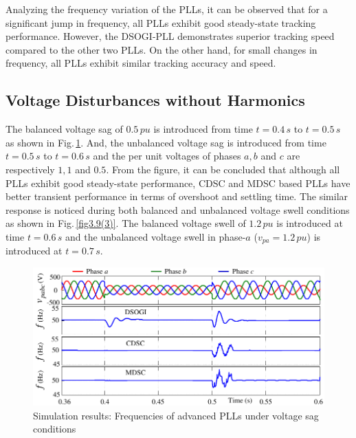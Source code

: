 Analyzing the frequency variation of the PLLs, it can be observed that for a significant jump in frequency, all PLLs exhibit good steady-state tracking performance. However, the DSOGI-PLL demonstrates superior tracking speed compared to the other two PLLs. On the other hand, for small changes in frequency, all PLLs exhibit similar tracking accuracy and speed. 
\subsection{Voltage Disturbances without Harmonics}
The balanced voltage sag of $0.5\,\si{pu}$ is introduced from time $t=0.4\,\si{s}$ to $t=0.5\,\si{s}$ as shown in Fig.\,\ref{fig3.9(2)}. And, the unbalanced voltage sag is introduced from time $t=0.5\,\si{s}$ to $t=0.6\,\si{s}$ and the per unit voltages of phases $a,b$ and $c$ are respectively $1, 1$ and $0.5$. From the figure, it can be concluded that although all PLLs exhibit good steady-state performance, CDSC and MDSC based PLLs have better transient performance in terms of overshoot and settling time. The similar response is noticed during both balanced and unbalanced voltage swell conditions as shown in Fig.\,\ref{fig3.9(3)}. The balanced voltage swell of $1.2\,\si{pu}$ is introduced at time $t=0.6\,\si{s}$ and the unbalanced voltage swell in phase-$a$ ($v_{pa}=1.2\,\si{pu}$) is introduced at $t=0.7\,\si{s}$.
\begin{figure}[h] 
	\centering
	\includegraphics[scale=1]{figures/Chapter_3/Mine/SimRes2_new.pdf}
	\caption{Simulation results: Frequencies of advanced PLLs under voltage sag conditions}
	\label{fig3.9(2)}
\end{figure}
